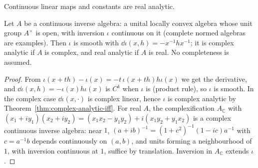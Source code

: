 Continuous linear maps and constants are real analytic.

\begin{theorem}
  \label{thm:cia-inversion}
  \leanok
  Let $A$ be a continuous inverse algebra: a unital locally convex algebra whose unit group $A^\times$
  is open, with inversion $\iota$ continuous on it (complete normed algebras are examples). Then
  $\iota$ is smooth with $\dd\iota(x, h) = -x^{-1} h x^{-1}$; it is complex analytic if $A$ is
  complex, and real analytic if $A$ is real. No completeness is assumed.
\end{theorem}

\begin{proof}
  \leanok
  From $\iota(x + th) - \iota(x) = -t\, \iota(x + th) h \iota(x)$ we get the derivative, and
  $\dd\iota(x, h) = -\iota(x) h \iota(x)$ is $C^k$ when $\iota$ is (product rule), so $\iota$ is smooth.
  In the complex case $\dd\iota(x, \cdot)$ is complex linear, hence $\iota$ is complex analytic by
  Theorem~\ref{thm:complex-analytic-iff}. For real $A$, the complexification $A_{\mathbb{C}}$ with
  $(x_1 + iy_1)(x_2 + iy_2) = (x_1x_2 - y_1y_2) + i(x_1y_2 + y_1x_2)$ is a complex continuous
  inverse algebra: near $1$, $(a + ib)^{-1} = (1 + c^2)^{-1}(1 - ic)a^{-1}$ with $c = a^{-1}b$
  depends continuously on $(a, b)$, and units forming a neighbourhood of $1$, with inversion
  continuous at $1$, suffice by translation. Inversion in $A_{\mathbb{C}}$ extends $\iota$.
\end{proof}

